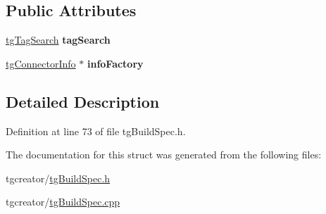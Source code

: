 \subsection*{Public Attributes}
\begin{DoxyCompactItemize}
\item 
\hypertarget{structtg_build_spec_1_1_connector_agent_a905f28a41a64416ec46081054b60eda6}{\hyperlink{classtg_tag_search}{tg\-Tag\-Search} {\bfseries tag\-Search}}\label{structtg_build_spec_1_1_connector_agent_a905f28a41a64416ec46081054b60eda6}

\item 
\hypertarget{structtg_build_spec_1_1_connector_agent_af88a5a4bb8092aa8f721e3b4cb289cfd}{\hyperlink{classtg_connector_info}{tg\-Connector\-Info} $\ast$ {\bfseries info\-Factory}}\label{structtg_build_spec_1_1_connector_agent_af88a5a4bb8092aa8f721e3b4cb289cfd}

\end{DoxyCompactItemize}


\subsection{Detailed Description}


Definition at line 73 of file tg\-Build\-Spec.\-h.



The documentation for this struct was generated from the following files\-:\begin{DoxyCompactItemize}
\item 
tgcreator/\hyperlink{tg_build_spec_8h}{tg\-Build\-Spec.\-h}\item 
tgcreator/\hyperlink{tg_build_spec_8cpp}{tg\-Build\-Spec.\-cpp}\end{DoxyCompactItemize}
